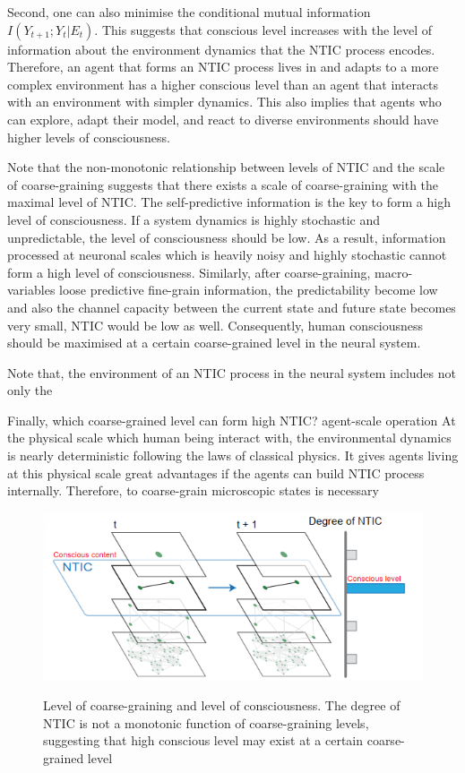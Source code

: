 \documentclass[utf8]{article}
\begin{document}
	    Second, one can also minimise the conditional mutual information  $I(Y_{t+1};Y_{t}|E_{t})$. This suggests that conscious level increases with the level of information about the environment dynamics that the NTIC process encodes. Therefore, an agent that forms an NTIC process lives in and adapts to a more complex environment has a higher conscious level than an agent that interacts with an environment with simpler dynamics. This also implies that agents who can explore, adapt their model, and react to diverse environments should have higher levels of consciousness. 
	    
	    Note that the non-monotonic relationship between levels of NTIC and the scale of coarse-graining suggests that there exists a scale of coarse-graining with the maximal level of NTIC. The self-predictive information is the key to form a high level of consciousness. If a system dynamics is highly stochastic and unpredictable, the level of consciousness should be low. As a result, information processed at neuronal scales which is heavily noisy and highly stochastic cannot form a high level of consciousness. Similarly, after coarse-graining, macro-variables loose predictive fine-grain information, the predictability become low and also the channel capacity between the current state and future state becomes very small, NTIC would be low as well. Consequently, human consciousness should be maximised at a certain coarse-grained level in the neural system. 
	    
	    Note that, the environment of an NTIC process in the neural system includes not only the
        
        Finally, which coarse-grained level can form high NTIC? 
        agent-scale operation
        At the physical scale which human being interact with, the environmental dynamics is nearly deterministic following the laws of classical physics. It gives agents living at this physical scale great advantages if the agents can build NTIC process internally. Therefore, to coarse-grain microscopic states is necessary
	   
			
		\begin{figure}[H]				
    		\includegraphics[width=\textwidth]{WritingMaterials/Fig_temp/FoxitReader_2019-01-31_19-03-59.png}
    		\label{fig:LevelOfConsciousness}
    		\caption{Level of coarse-graining and level of consciousness. The degree of NTIC is not a monotonic function of coarse-graining levels, suggesting that high conscious level may exist at a certain coarse-grained level }
		\end{figure}
\end{document}
